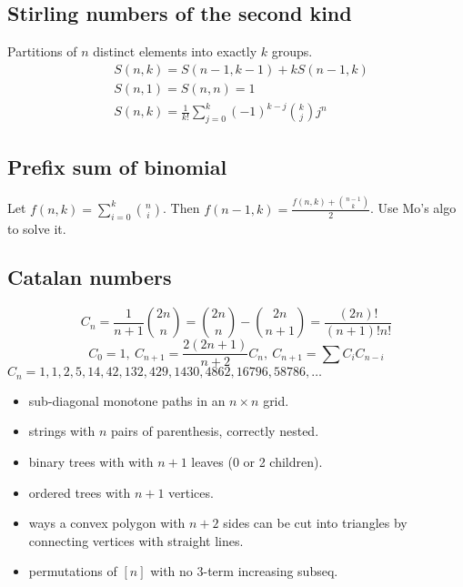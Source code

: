 \subsection{Stirling numbers of the second kind} %
Partitions of $n$ distinct elements into exactly $k$ groups.
\begin{align*}
& S(n, k) = S(n - 1, k - 1) + k S(n - 1,k) \\
& S(n, 1) = S(n, n) = 1 \\
& S(n, k) = \frac{1}{k!}\sum_{j = 0}^k (-1)^{k - j}\binom{k}{j}j^n
\end{align*}

\subsection{Prefix sum of binomial}
Let $f(n,k) = \sum_{i=0}^{k}\binom{n}{i}$.
Then $f(n-1,k)=\frac{f(n,k) + \binom{n-1}{k}}{2}$.
Use Mo's algo to solve it.

\subsection{Catalan numbers} %
\[ C_n=\frac{1}{n+1}\binom{2n}{n}= \binom{2n}{n}-\binom{2n}{n+1} = \frac{(2n)!}{(n+1)!n!} \]
\[ C_0=1,\ C_{n+1} = \frac{2(2n+1)}{n+2}C_n,\ C_{n+1}=\sum C_iC_{n-i} \]
${C_n = 1, 1, 2, 5, 14, 42, 132, 429, 1430, 4862, 16796, 58786, \dots}$
\begin{itemize}[noitemsep]
	\item sub-diagonal monotone paths in an $n\times n$ grid.
	\item strings with $n$ pairs of parenthesis, correctly nested.
	\item binary trees with with $n+1$ leaves (0 or 2 children).
	\item ordered trees with $n+1$ vertices.
	\item ways a convex polygon with $n+2$ sides can be cut into triangles by connecting vertices with straight lines.
	\item permutations of $[n]$ with no 3-term increasing subseq.
\end{itemize}
